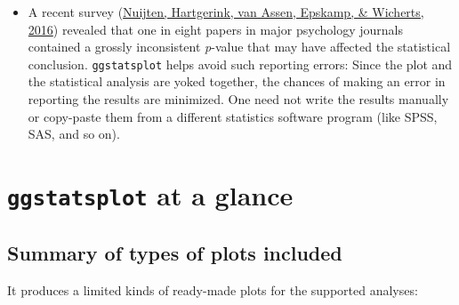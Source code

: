 \documentclass[
]{article}
\providecommand{\tightlist}{%
  \setlength{\itemsep}{0pt}\setlength{\parskip}{0pt}}
\begin{document}
\begin{itemize}
\tightlist
\item
  A recent survey (\protect\hyperlink{ref-nuijtenPrevalenceStatisticalReporting2016}{Nuijten, Hartgerink, van Assen, Epskamp, \& Wicherts, 2016}) revealed that
  one in eight papers in major psychology journals contained a grossly
  inconsistent \emph{p}-value that may have affected the statistical conclusion.
  \texttt{ggstatsplot} helps avoid such reporting errors: Since the plot and the
  statistical analysis are yoked together, the chances of making an error in
  reporting the results are minimized. One need not write the results manually
  or copy-paste them from a different statistics software program (like SPSS,
  SAS, and so on).
\end{itemize}

\hypertarget{ggstatsplot-at-a-glance}{%
\section{\texorpdfstring{\texttt{ggstatsplot} at a glance}{ggstatsplot at a glance}}\label{ggstatsplot-at-a-glance}}

\hypertarget{summary-of-types-of-plots-included}{%
\subsection{Summary of types of plots included}\label{summary-of-types-of-plots-included}}

It produces a limited kinds of ready-made plots for the supported analyses:
\end{document}

